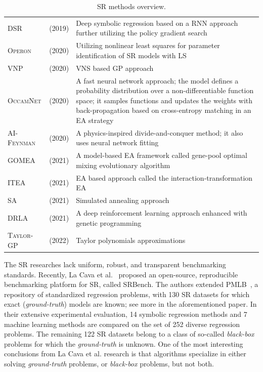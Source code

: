 \documentclass[a4paper,12pt]{elsarticle}
\begin{document}
\begin{table}[!h]
{\begin{tabularx}{550pt}{l  l  X}
				\textsc{DSR}  & \cite{petersen2019deep} (2019) & Deep symbolic regression based on a RNN approach further utilizing the policy gradient search \\
				\textsc{Operon} & \cite{kommenda2020parameter} (2020) &  Utilizing nonlinear least squares for parameter identification of SR models with LS \\
				\textsc{VNP}    & \cite{elleuch2020variable} (2020) & VNS based GP approach \\
				\textsc{OccamNet} & \cite{costa2020fast} (2020) &   A fast neural network approach; the model defines a probability distribution over a non-differentiable function space; it samples functions and updates the weights with back-propagation  based on cross-entropy matching in an EA strategy	 \\
				
				\textsc{AI-Feynman} & \cite{udrescu2020ai} (2020) & A physics-inspired divide-and-conquer method; it also uses neural network fitting \\
				\textsc{GOMEA}  & \cite{virgolin2021improving} (2021)    & A model-based
				EA framework called gene-pool optimal mixing evolutionary algorithm \\
				\textsc{ITEA} & \cite{de2021interaction} (2021)   & EA based approach called the interaction-transformation EA   \\
				\textsc{SA} & \cite{kantor2021simulated} (2021) &  Simulated annealing approach \\
				
				\textsc{DRLA} & \cite{mundhenk2021symbolic} (2021)  &    A deep reinforcement learning approach enhanced with genetic programming \\
				\textsc{Taylor-GP} &  \cite{he2022taylor} (2022)  &  Taylor polynomials approximations  \\ \hline
				
				
		\end{tabularx} }
		\caption{SR methods overview.}
		\label{tab:gp-based}
	\end{table}
	
	
   The SR researches lack uniform, robust, and transparent
	benchmarking standards. Recently, La Cava et al.~\cite{la2021contemporary} proposed an
	open-source, reproducible benchmarking platform for SR, called SRBench. The authors extended  PMLB~\cite{olson2017pmlb},  a repository of standardized regression problems, with 130 SR datasets for which exact (\emph{ground-truth}) models are known; see more in the aforementioned paper. In their extensive experimental evaluation, 14
	symbolic regression methods and 7 machine learning methods are compared on the set of 252 diverse regression problems. The remaining 122 SR datasets belong to a class of so-called \emph{black-box} problems for which the \emph{ground-truth} is unknown. One of the most interesting conclusions from La Cava et al. research is that algorithms specialize in either solving \emph{ground-truth} problems, or \emph{black-box} problems, but not both. 
	
\end{document}
